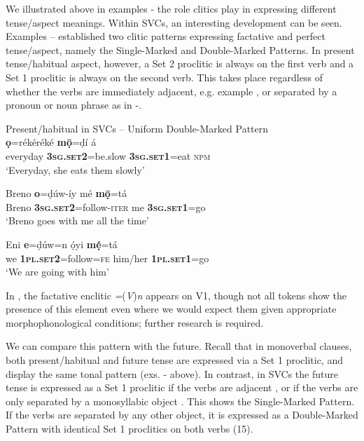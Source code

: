 \documentclass[output=paper]{langsci/langscibook}
\begin{document}
We illustrated above in examples - the role clitics play in expressing different tense/aspect meanings. Within SVCs, an interesting development can be seen. Examples -- established two clitic patterns expressing factative and perfect tense/aspect, namely the Single-Marked and Double-Marked Patterns. In present tense/habitual aspect, however, a Set 2 proclitic is always on the first verb and a Set 1 proclitic is always on the second verb. This takes place regardless of whether the verbs are immediately adjacent, e.g. example , or separated by a pronoun or noun phrase as in -. 

\ea
{Present/habitual in SVCs – Uniform Double-Marked Pattern}\\
   \ea\label{ex:rolle:14}
  \textbf{ọ}=rékéréké       \textbf{mọ̄}=ḍí       á\\ 
       everyday     \textbf{\textsc{3sg.set2}}=be.slow  \textbf{\textsc{3sg.set1}}=eat  \textsc{npm}\\
\glt ‘Everyday, she eats them slowly’ 

\ex\label{ex:rolle:15}
\gll   Breno   \textbf{o}=ḍúw-íy         mé   \textbf{mọ̄}=tá\\ 
       Breno   \textbf{\textsc{3sg.set2}}=follow-\textsc{iter}  me   \textbf{3}\textbf{\textsc{sg.set1}}\textsc{=}go\\
\glt ‘Breno goes with me all the time’

\ex\label{ex:rolle:16}
\gll   Eni   \textbf{e}=ḍúw=n       ọ́yi       \textbf{mẹ́}=tá\\ 
       we   \textbf{\textsc{1pl.set2}}=follow=\textsc{fe}   him/her    \textbf{\textsc{1pl.set1}}=go\\
\glt ‘We are going with him’
\z
\z 

In , the factative enclitic \textit{=}(\textit{V})\textit{n} appears on V1, though not all tokens show the presence of this element even where we would expect them given appropriate morphophonological conditions; further research is required. 

We can compare this pattern with the future. Recall that in monoverbal clauses, both present/habitual and future tense are expressed via a Set 1 proclitic, and display the same tonal pattern (exs. - above). In contrast, in SVCs the future tense is expressed as a Set 1 proclitic if the verbs are adjacent , or if the verbs are only separated by a monosyllabic object . This shows the Single-Marked Pattern. If the verbs are separated by any other object, it is expressed as a Double-Marked Pattern with identical Set 1 proclitics on both verbs (15).  
\end{document}
